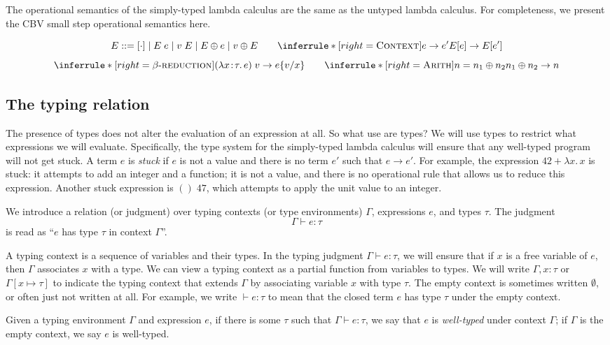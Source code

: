The operational semantics of the simply-typed lambda calculus are the same as the untyped lambda calculus. For completeness, we present the CBV small step operational semantics here.

\[
E ::= \hole \mid E\; e \mid v\; E \mid E \oplus e \mid v \oplus E
\qquad
\inferrule*[right=\rn{Context}]{e \to e'}{E[e] \to E[e']}
\]
\[
\inferrule*[right=\mbox{$\beta$-\rn{reduction}}]{ }{(\lam{x}{\tau} e)\; v \to e\subst{v}{x}}
\qquad
\inferrule*[right=\rn{Arith}]{n = n_1 \oplus n_2}{n_1 \oplus n_2 \to n}
\]

\subsection{The typing relation}

The presence of types does not alter the evaluation of an expression at all. So what use are types? We will use types to restrict what expressions we will evaluate. Specifically, the type system for the simply-typed lambda calculus will ensure that any well-typed program will not get stuck. A term $e$ is \emph{stuck} if $e$ is not a value and there is no term $e'$ such that $e \to e'$. For example, the expression $42 + \lambda x.\, x$ is stuck: it attempts to add an integer and a function; it is not a value, and there is no operational rule that allows us to reduce this expression. Another stuck expression is $()\; 47$, which attempts to apply the unit value to an integer.

We introduce a relation (or judgment) over typing contexts (or type environments) $\Gamma$, expressions $e$, and types $\tau$. The judgment
\[
\Gamma \vdash e : \tau
\]
is read as ``$e$ has type $\tau$ in context $\Gamma$''.

A typing context is a sequence of variables and their types. In the typing judgment $\Gamma \vdash e : \tau$, we will ensure that if $x$ is a free variable of $e$, then $\Gamma$ associates $x$ with a type. We can view a typing context as a partial function from variables to types. We will write $\Gamma, x:\tau$ or $\Gamma[x \mapsto \tau]$ to indicate the typing context that extends $\Gamma$ by associating variable $x$ with type $\tau$. The empty context is sometimes written $\emptyset$, or often just not written at all. For example, we write $\vdash e : \tau$ to mean that the closed term $e$ has type $\tau$ under the empty context.

Given a typing environment $\Gamma$ and expression $e$, if there is some $\tau$ such that $\Gamma \vdash e : \tau$, we say that $e$ is \emph{well-typed} under context $\Gamma$; if $\Gamma$ is the empty context, we say $e$ is well-typed.

